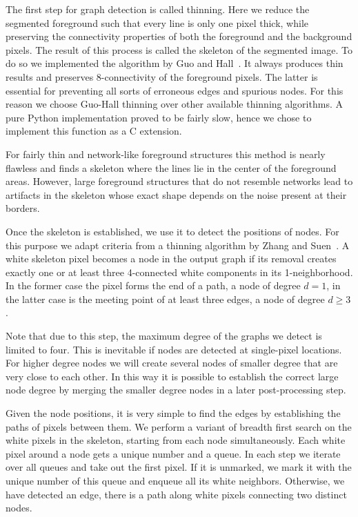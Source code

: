 		The first step for graph detection is called thinning. Here we reduce the segmented foreground such that every line is only one pixel thick, while preserving the connectivity properties of both the foreground and the background pixels. The result of this process is called the skeleton of the segmented image. To do so we implemented the algorithm by Guo and Hall~\cite{guo1989parallel}. It always produces thin results and preserves 8-connectivity of the foreground pixels. The latter is essential for preventing all sorts of erroneous edges and spurious nodes. For this reason we choose Guo-Hall thinning over other available thinning algorithms. A pure Python implementation proved to be fairly slow, hence we chose to implement this function as a C extension. 

		For fairly thin and network-like foreground structures this method is nearly flawless and finds a skeleton where the lines lie in the center of the foreground areas. However, large foreground structures that do not resemble networks lead to artifacts in the skeleton whose exact shape depends on the noise present at their borders.

		Once the skeleton is established, we use it to detect the positions of nodes. For this purpose we adapt criteria from a thinning algorithm by Zhang and Suen~\cite{zhang1984fast}. A white skeleton pixel becomes a node in the output graph if its removal creates exactly one or at least three 4-connected white components in its 1-neighborhood. In the former case the pixel forms the end of a path, \ie a node of degree $d = 1$, in the latter case is the meeting point of at least three edges, \ie a node of degree $d \ge 3$.

		Note that due to this step, the maximum degree of the graphs we detect is limited to four. This is inevitable if nodes are detected at single-pixel locations. For higher degree nodes we will create several nodes of smaller degree that are very close to each other. In this way it is possible to establish the correct large node degree by merging the smaller degree nodes in a later post-processing step.

		Given the node positions, it is very simple to find the edges by establishing the paths of pixels between them. We perform a variant of breadth first search on the white pixels in the skeleton, starting from each node simultaneously. Each white pixel around a node gets a unique number and a queue. In each step we iterate over all queues and take out the first pixel. If it is unmarked, we mark it with the unique number of this queue and enqueue all its white neighbors. Otherwise, we have detected an edge, \ie there is a path along white pixels connecting two distinct nodes.

